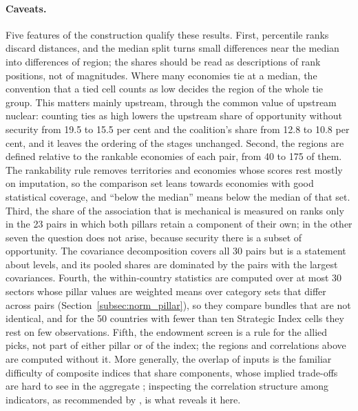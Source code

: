 \paragraph{Caveats.} Five features of the construction qualify these results. First, percentile
ranks discard distances, and the median split turns small differences near the median into
differences of region; the shares should be read as descriptions of rank positions, not of
magnitudes. Where many economies tie at a median, the convention that a tied cell counts as low
decides the region of the whole tie group. This matters mainly upstream, through the common
value of upstream nuclear: counting ties as high lowers the upstream share of opportunity
without security from 19.5 to 15.5 per cent and the coalition's share from 12.8 to 10.8 per cent,
and it leaves the ordering of the stages unchanged. Second, the regions are defined relative to
the rankable economies of each pair, from 40 to 175 of them. The rankability rule removes
territories and economies whose scores rest mostly on imputation, so the comparison set leans
towards economies with good statistical coverage, and ``below the median'' means below the median
of that set. Third, the share of the association that is mechanical is measured on ranks only in
the 23 pairs in which both pillars retain a component of their own; in the other seven the
question does not arise, because security there is a subset of opportunity. The covariance
decomposition covers all 30 pairs but is a statement about levels, and its pooled shares are
dominated by the pairs with the largest covariances. Fourth, the within-country statistics are
computed over at most 30 sectors whose pillar values are weighted means over category sets that
differ across pairs (Section~\ref{subsec:norm_pillar}), so they compare bundles that are not
identical, and for the 50 countries with fewer than ten Strategic Index cells they rest on few
observations. Fifth, the endowment screen is a rule for the allied picks, not part of either
pillar or of the index; the regions and correlations above are computed without it. More
generally, the overlap of inputs is the familiar difficulty of composite indices that share
components, whose implied trade-offs are hard to see in the aggregate
\citep{ravallion2012mashup}; inspecting the correlation structure among indicators, as
recommended by \citet{oecd2008handbook}, is what reveals it here.
